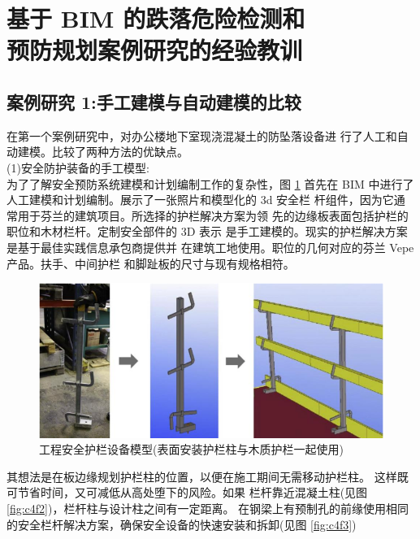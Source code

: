 \section{基于 BIM 的跌落危险检测和\\预防规划案例研究的经验教训}
\subsection{案例研究 1:手工建模与自动建模的比较}

在第一个案例研究中，对办公楼地下室现浇混凝土的防坠落设备进
行了人工和自动建模。比较了两种方法的优缺点。\\

(1)安全防护装备的手工模型:\\

为了了解安全预防系统建模和计划编制工作的复杂性，图 \ref{fig:c4f1} 首先在 BIM
中进行了人工建模和计划编制。展示了一张照片和模型化的 3d 安全栏
杆组件，因为它通常用于芬兰的建筑项目。所选择的护栏解决方案为领
先的边缘板表面包括护栏的职位和木材栏杆。定制安全部件的 3D 表示
是手工建模的。现实的护栏解决方案是基于最佳实践信息承包商提供并
在建筑工地使用。职位的几何对应的芬兰 Vepe 产品。扶手、中间护栏
和脚趾板的尺寸与现有规格相符。

\begin{figure}[thbp!]
    \centering
    \includegraphics[width=1.0\linewidth]{res/c4f1.png}
    \caption{工程安全护栏设备模型(表面安装护栏柱与木质护栏一起使用)}
    \label{fig:c4f1}
\end{figure}

其想法是在板边缘规划护栏柱的位置，以便在施工期间无需移动护栏柱。
这样既可节省时间，又可减低从高处堕下的风险。如果
栏杆靠近混凝土柱(见图 \ref{fig:c4f2})，栏杆柱与设计柱之间有一定距离。
在钢梁上有预制孔的前缘使用相同的安全栏杆解决方案，确保安全设备的快速安装和拆卸(见图 \ref{fig:c4f3})

